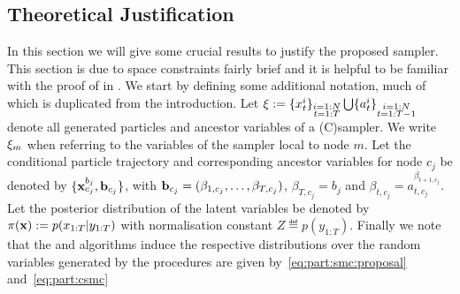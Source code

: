 \subsection{Theoretical Justification}
\label{sec:part:ipmcmc:theory}
In this section we will give some crucial results to justify the proposed \ipmc sampler. This section is due to space constraints fairly brief and it is helpful to be familiar with the proof of \pg in \citet{andrieuDH2010}.
We start by defining some additional notation, much of which is duplicated from the \pg introduction.
Let $\mathbf{\xi} := \{x_{t}^i\}_{\substack{i=1:N\\t=1:T}} \bigcup \{a_{t}^i\}_{\substack{i=1:N\\t=1:T-1}}$
denote all generated particles and ancestor variables of a (C)\smc sampler.
We write $\mathbf{\xi}_m$ when referring to the variables of the sampler local to node $m$.
%
Let the conditional particle trajectory and corresponding ancestor variables for node $c_j$ be denoted by $\{\mathbf{x}_{c_j}^{b_j},\mathbf{b}_{c_j}\}$, with $\mathbf{b}_{c_j} = (\beta_{1,c_j},\ldots,\beta_{T,c_j})$,
$\beta_{T,c_j} = b_j$ and $\beta_{t,c_j} = a_{t,c_j}^{\beta_{t+1,c_j}}$. %
Let the posterior distribution of the latent variables be denoted by $\pi(\mathbf{x}) := p(x_{1:T}|y_{1:T})$ with normalisation constant $Z \eqdef p(y_{1:T})$. 
%
Finally we %
note that the \smc and \csmc algorithms induce the respective distributions over the random variables
generated by the procedures are given by~\eqref{eq:part:smc:proposal} and~\eqref{eq:part:csmc}
